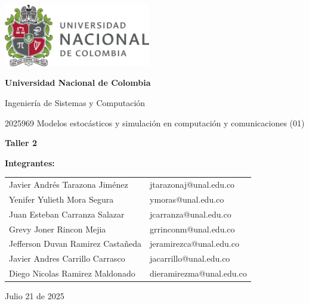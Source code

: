 \documentclass{article}
\begin{document}
\begin{titlepage}
    \centering
    \includegraphics[width=0.48\textwidth]{logo_universidad.png}
    \par\vspace{2cm}

    {\Large \textbf{Universidad Nacional de Colombia} \par}
    \vspace{0.5cm}
    {\large Ingeniería de Sistemas y Computación \par}
    {\large 2025969 Modelos estocásticos y simulación en computación y comunicaciones (01)\par}
    \vspace{3cm}

    {\large \textbf{Taller 2} \par}
    \vspace{3cm}

    {\large \textbf{Integrantes:} \par}
    \vspace{0.5cm}
    \begin{tabular}{ll}
    Javier Andrés Tarazona Jiménez & jtarazonaj@unal.edu.co \\
    Yenifer Yulieth Mora Segura & ymoras@unal.edu.co \\
    Juan Esteban Carranza Salazar & jcarranza@unal.edu.co \\
    Grevy Joner Rincon Mejia & grrinconm@unal.edu.co \\
    Jefferson Duvan Ramirez Castañeda & jeramirezca@unal.edu.co \\
    Javier Andres Carrillo Carrasco & jacarrillo@unal.edu.co \\
    Diego Nicolas Ramirez Maldonado & dieramirezma@unal.edu.co \\
    \end{tabular}
    \par\vspace{3cm}

    {\large Julio 21 de 2025 \par}
\end{titlepage}
\end{document}
